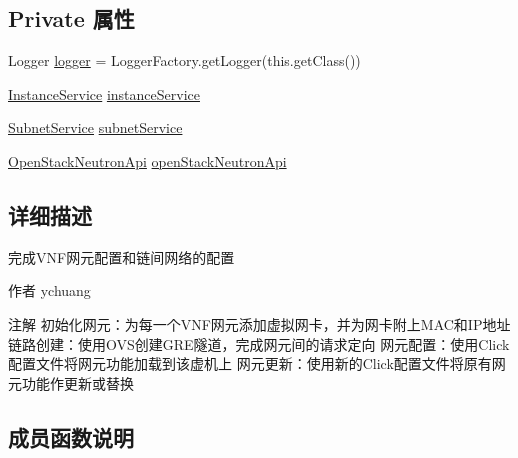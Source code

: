 \subsection*{Private 属性}
\begin{DoxyCompactItemize}
\item 
Logger \mbox{\hyperlink{classcom_1_1example_1_1demo_1_1configplatform_1_1_s_s_h_config_api_a26870a229197a67addeff9bb888fa854}{logger}} = Logger\+Factory.\+get\+Logger(this.\+get\+Class())
\item 
\mbox{\hyperlink{classcom_1_1example_1_1demo_1_1service_1_1_instance_service}{Instance\+Service}} \mbox{\hyperlink{classcom_1_1example_1_1demo_1_1configplatform_1_1_s_s_h_config_api_a62f77b5e73b2b03d85ec7a74f38ae52b}{instance\+Service}}
\item 
\mbox{\hyperlink{classcom_1_1example_1_1demo_1_1service_1_1_subnet_service}{Subnet\+Service}} \mbox{\hyperlink{classcom_1_1example_1_1demo_1_1configplatform_1_1_s_s_h_config_api_a4eab69cb84e31fa57049fa66e8257ab6}{subnet\+Service}}
\item 
\mbox{\hyperlink{classcom_1_1example_1_1demo_1_1openstack_1_1_open_stack_neutron_api}{Open\+Stack\+Neutron\+Api}} \mbox{\hyperlink{classcom_1_1example_1_1demo_1_1configplatform_1_1_s_s_h_config_api_ae1d3e210a8f0cb334c687e89dc05a2fe}{open\+Stack\+Neutron\+Api}}
\end{DoxyCompactItemize}


\subsection{详细描述}
完成\+V\+N\+F网元配置和链间网络的配置 

\begin{DoxyAuthor}{作者}
ychuang 
\end{DoxyAuthor}
\begin{DoxyNote}{注解}
初始化网元：为每一个\+V\+N\+F网元添加虚拟网卡，并为网卡附上\+M\+A\+C和\+I\+P地址 链路创建：使用\+O\+V\+S创建\+G\+R\+E隧道，完成网元间的请求定向 网元配置：使用\+Click配置文件将网元功能加载到该虚机上 网元更新：使用新的\+Click配置文件将原有网元功能作更新或替换 
\end{DoxyNote}


\subsection{成员函数说明}
\mbox{\label{classcom_1_1example_1_1demo_1_1configplatform_1_1_s_s_h_config_api_abeccd15f19b2d50b39382aee0b2b49cd}} 
